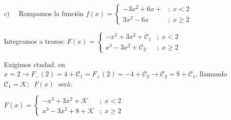 \begin{proofw}
$c) \quad$ Rompamos la función $f(x)=\begin{cases}
								-3x^2+6x+  &; \;  x<2 \\
								3x^2-6x  &; \;  x\ge 2
								\end{cases} \;$
							
Integramos a trozos: $F(x)=\begin{cases}
				-x^3+3x^2+\mathcal{C}_1 &; \; x<2 \\
				x^3-3x^2+\mathcal{C}_2 &; \; x\ge 2
					\end{cases}$
					
Exigimos ctndad. en $x=2 \to F_-(2)=4+\mathcal{C}_1=F_+(2)=-4+\mathcal{C}_2 \to \mathcal{C}_2=8+\mathcal{C}_1$, llamando $\mathcal{C}_1=\mathcal{K}; \; \; F(x)\; $ será:

 $F(x)=\begin{cases}
		-x^3+3x^2+\mathcal{K} &; \; x<2 \\
		x^3-3x^2+8+\mathcal{K} &; \; x\ge 2
		\end{cases}$


\end{proofw}

